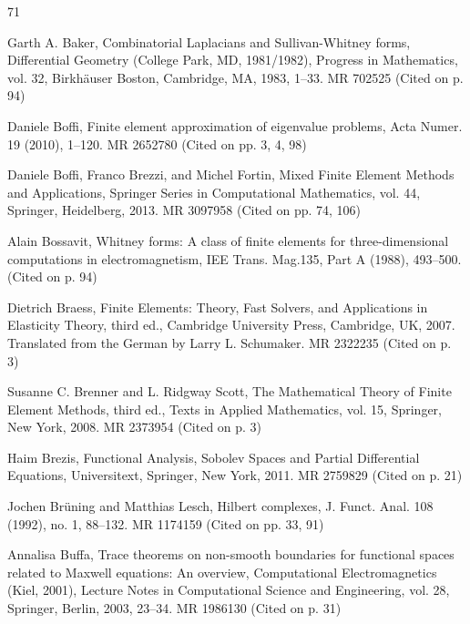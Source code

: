\begin{MBSourceBibliography}{71}
\item\label{bib:source-17}Garth A. Baker, Combinatorial Laplacians and Sullivan-Whitney forms, Differential Geometry (College Park, MD, 1981/1982), \newline Progress in Mathematics, vol. 32, Birkhäuser Boston, Cambridge, MA, 1983, 1–33. MR 702525 (Cited on p. 94)

\item\label{bib:source-18}Daniele Boffi, Finite element approximation of eigenvalue problems, Acta Numer. 19 (2010), 1–120. MR 2652780 (Cited on pp. 3, 4, 98)

\item\label{bib:source-19}Daniele Boffi, Franco Brezzi, and Michel Fortin, Mixed Finite Element Methods and Applications, Springer Series in Computational Mathematics, vol. 44, Springer, Heidelberg, 2013. MR 3097958 (Cited on pp. 74, 106)

\item\label{bib:source-20}Alain Bossavit, Whitney forms: A class of finite elements for three-dimensional computations in electromagnetism, IEE Trans. Mag.135, Part A (1988), 493–500. (Cited on p. 94)

\item\label{bib:source-21}Dietrich Braess, Finite Elements: Theory, Fast Solvers, and Applications in Elasticity Theory, third ed., Cambridge University Press, Cambridge, UK, 2007. Translated from the German by Larry L. Schumaker. MR 2322235 (Cited on p. 3)

\item\label{bib:source-22}Susanne C. Brenner and L. Ridgway Scott, The Mathematical Theory of Finite Element Methods, third ed., Texts in Applied Mathematics, vol. 15, Springer, New York, 2008. MR 2373954 (Cited on p. 3)

\item\label{bib:source-23}Haim Brezis, Functional Analysis, Sobolev Spaces and Partial Differential Equations, Universitext, Springer, New York, 2011. MR 2759829 (Cited on p. 21)

\item\label{bib:source-24}Jochen Brüning and Matthias Lesch, Hilbert complexes, J. Funct. Anal. 108 (1992), no. 1, 88–132. MR 1174159 (Cited on pp. 33, 91)

\item\label{bib:source-25}Annalisa Buffa, Trace theorems on non-smooth boundaries for functional spaces related to Maxwell equations: An overview, Computational Electromagnetics (Kiel, 2001), Lecture Notes in Computational Science and Engineering, vol. 28, Springer, Berlin, 2003, 23–34. MR 1986130 (Cited on p. 31)


\end{MBSourceBibliography}
